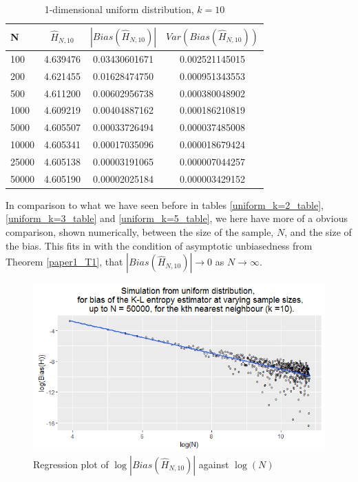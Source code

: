 \documentclass{article}
\begin{document}
\begin{table}
\caption{1-dimensional uniform distribution, $k=10$} \label{uniform_k=10_table}
\begin{center}
\begin{tabular}{| l | c c c|} 
\toprule
N & $\hat{H}_{N, 10}$ & $|Bias(\hat{H}_{N, 10})|$ & $Var(Bias(\hat{H}_{N, 10}))$ \\
\midrule[1pt]
100     & 4.639476     & 0.03430601671     & 0.002521145015  \\
200     & 4.621455     & 0.01628474750     & 0.000951343553  \\
500     & 4.611200     & 0.00602956738     & 0.000380048902  \\
1000    & 4.609219     & 0.00404887162     & 0.000186210819  \\
5000    & 4.605507     & 0.00033726494     & 0.000037485008  \\
10000   & 4.605341     & 0.00017035096     & 0.000018679424  \\
25000   & 4.605138     & 0.00003191065     & 0.000007044257  \\
50000   & 4.605190     & 0.00002025184     & 0.000003429152  \\
\hline
\end{tabular}
\end{center}
\end{table}

In comparison to what we have seen before in tables \ref{uniform_k=2_table}, \ref{uniform_k=3_table} and \ref{uniform_k=5_table}, we here have more of a obvious comparison, shown numerically, between the size of the sample, $N$, and the size of the bias. This fits in with the condition of asymptotic unbiasedness from Theorem \ref{paper1_T1}, that $|Bias(\hat{H}_{N, 10})| \to 0$ as $N \to \infty$. 

\begin{figure}
  \begin{center}
    \includegraphics[width=\textwidth]{./Graphs/Uniform_k=10_plot.png}
  \end{center}
\caption{Regression plot of $\log|Bias(\hat{H}_{N, 10})|$ against $\log(N)$}
  \label{uniform_k=10_graph}
\end{figure}
\end{document}
